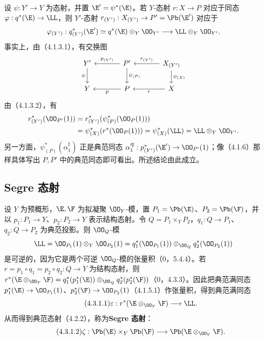 设 $\psi:Y'\to Y$ 为态射，并置 $\E'=\psi^*(\E)$。若 $Y$-态射 $r:X\to P$ 对应于同态 $\varphi:q^*(\E)\to\LL$，则 $Y'$-态射
$r_{(Y')}:X_{(Y')}\to P'=\Pb(\E')$ 对应于
\[
\varphi_{(Y')}:q_{(Y')}^*(\E')
\simeq q^*(\E)\otimes_Y\OO_{Y'}\longrightarrow\LL\otimes_Y\OO_{Y'}.
\]
事实上，由（4.1.3.1），有交换图
\[
\begin{tikzcd}[column sep=large]
Y' \arrow[d,"\psi"'] & P' \arrow[l,"p_{(Y')}"'] \arrow[d,"\psi_{(P)}"] & X_{(Y')} \arrow[l,"r_{(Y')}"'] \arrow[d,"\psi_{(X)}"]\\
Y & P \arrow[l,"p"] & X \arrow[l,"r"]
\end{tikzcd}
\]
由（4.1.3.2），有
\[
\begin{aligned}
r_{(Y')}^*(\OO_{P'}(1))
&=r_{(Y')}^*(\psi_{(P)}^*(\OO_P(1)))\\
&=\psi_{(X)}^*(r^*(\OO_P(1)))
=\psi_{(X)}^*(\LL)=\LL\otimes_Y\OO_{Y'}.
\end{aligned}
\]
另一方面，$\psi_{(P)}^*(\alpha_1^\sharp)$ 正是典范同态
$\alpha_1'^\sharp:p_{(Y')}^*(\E')\to\OO_{P'}(1)$；像（4.1.6）那样具体写出 $P,P'$ 中的典范同态即可看出。所述结论由此成立。

\subsection{Segre 态射}
设 $Y$ 为预概形，$\E,\F$ 为拟凝聚 $\OO_Y$-模，置 $P_1=\Pb(\E)$、$P_2=\Pb(\F)$，并以 $p_1:P_1\to Y$、$p_2:P_2\to Y$ 表示结构态射。令 $Q=P_1\times_Y P_2$，$q_1:Q\to P_1$、$q_2:Q\to P_2$ 为典范投影。则 $\OO_Q$-模
\[
\LL=\OO_{P_1}(1)\otimes_Y\OO_{P_2}(1)
=q_1^*(\OO_{P_1}(1))\otimes_{\OO_Q}q_2^*(\OO_{P_2}(1))
\]
是可逆的，因为它是两个可逆 $\OO_Q$-模的张量积（0，5.4.4）。若 $r=p_1\circ q_1=p_2\circ q_2:Q\to Y$ 为结构态射，则
$r^*(\E\otimes_{\OO_Y}\F)=q_1^*(p_1^*(\E))\otimes_{\OO_Q}q_2^*(p_2^*(\F))$（0，4.3.3）。因此把典范满同态
$p_1^*(\E)\to\OO_{P_1}(1)$、$p_2^*(\F)\to\OO_{P_2}(1)$（4.1.5.1）作张量积，得到典范满同态
\begin{equation}\tag{4.3.1.1}\varepsilon:r^*(\E\otimes_{\OO_Y}\F)\longrightarrow\LL.\end{equation}
从而得到典范态射（4.2.2），称为\textbf{Segre 态射}：
\begin{equation}\tag{4.3.1.2}\zeta:\Pb(\E)\times_Y\Pb(\F)\longrightarrow\Pb(\E\otimes_{\OO_Y}\F).\end{equation}

